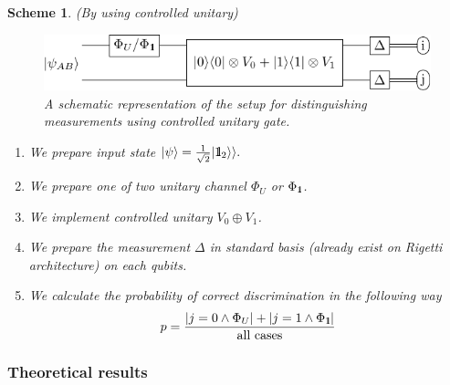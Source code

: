 \documentclass[preprint,12pt, a4paper]{elsarticle}
\newcommand{\ket}[1]{\ensuremath{|#1\rangle}}
\newcommand{\1}{{\rm 1\hspace{-0.9mm}l}}
\newcommand{\Id}{{\rm 1\hspace{-0.9mm}l}}
\newtheorem{scheme}{Scheme}
\begin{document}
\begin{scheme}(By using controlled unitary)
	\begin{figure}[h!]
		\centering 
		\includegraphics[scale=1.2]{pics/controlled_unitary} 
		
		\caption{ A schematic representation of the setup for distinguishing
			measurements using controlled unitary gate. 
		}\label{fig:controlled}
	\end{figure}
	\begin{enumerate}
		\item We prepare input state $\ket{\psi} = \frac{1}{\sqrt{2} } | \Id_2 \rangle 
		\rangle. $
		\item We prepare one of two unitary channel $\Phi_{U} $ or $\Phi_{\1}$. 
		\item We implement controlled unitary $V_0 \oplus V_1$.
		\item We prepare the measurement $\Delta$ in standard basis (already exist on 
		Rigetti architecture) on each qubits.
		\item We calculate the probability of correct discrimination in the following 
		way
		\begin{equation}
		p = \frac{|j=0 \wedge \Phi_{U} | + |j=1 \wedge \Phi_{\1}|}{\text{all 
				cases}}
		\end{equation}
	\end{enumerate}
\end{scheme}




\subsubsection{Theoretical results}
\end{document}
